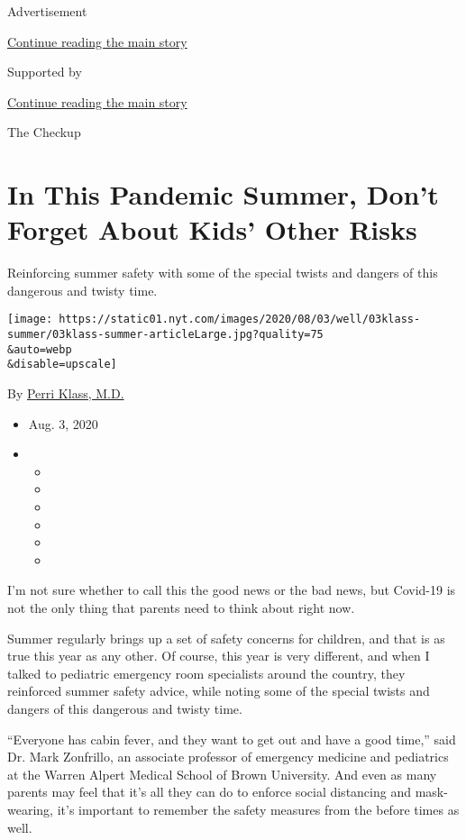 Advertisement

\protect\hyperlink{after-top}{Continue reading the main story}

Supported by

\protect\hyperlink{after-sponsor}{Continue reading the main story}

The Checkup

\hypertarget{in-this-pandemic-summer-dont-forget-about-kids-other-risks}{%
\section{In This Pandemic Summer, Don't Forget About Kids' Other
Risks}\label{in-this-pandemic-summer-dont-forget-about-kids-other-risks}}

Reinforcing summer safety with some of the special twists and dangers of
this dangerous and twisty time.

\texttt{[image: https://static01.nyt.com/images/2020/08/03/well/03klass-summer/03klass-summer-articleLarge.jpg?quality=75\\\&auto=webp\\\&disable=upscale]}

By \href{https://www.nytimes.com/by/perri-klass-md}{Perri Klass, M.D.}

\begin{itemize}
\item
  Aug. 3, 2020
\item
  \begin{itemize}
  \item
  \item
  \item
  \item
  \item
  \item
  \end{itemize}
\end{itemize}

I'm not sure whether to call this the good news or the bad news, but
Covid-19 is not the only thing that parents need to think about right
now.

Summer regularly brings up a set of safety concerns for children, and
that is as true this year as any other. Of course, this year is very
different, and when I talked to pediatric emergency room specialists
around the country, they reinforced summer safety advice, while noting
some of the special twists and dangers of this dangerous and twisty
time.

``Everyone has cabin fever, and they want to get out and have a good
time,'' said Dr. Mark Zonfrillo, an associate professor of emergency
medicine and pediatrics at the Warren Alpert Medical School of Brown
University. And even as many parents may feel that it's all they can do
to enforce social distancing and mask-wearing, it's important to
remember the safety measures from the before times as well.

